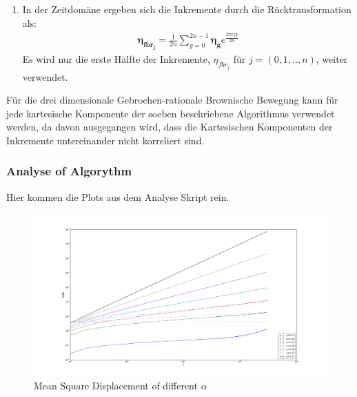 \documentclass[
  a4paper,BCOR10mm,oneside,
  bibtotoc,idxtotoc,
  headsepline,footsepline,%
  fleqn,openbib
]{scrbook}
\begin{document}
\begin{enumerate}
 \item In der Zeitdomäne ergeben sich die Inkremente durch die Rücktransformation als:
 \begin{align}
 \boldsymbol{\eta_{fbr_j}}= \frac{1}{2n} \sum_{g=0}^{2n-1} \boldsymbol{\eta_g} e^{\frac{2 \pi i j g }{2n}}
 \end{align}
Es wird nur die erste Hälfte der Inkremente, $\eta_{fbr_j}$ für $j=(0,1,..,n)$, weiter verwendet.
\end{enumerate}
Für die drei dimensionale Gebrochen-rationale Brownische Bewegung kann für jede kartesische Komponente der soeben beschriebene Algorithmus verwendet werden, da davon ausgegangen wird, dass die Kartesischen Komponenten der Inkremente untereinander nicht korreliert sind. 
\subsubsection{Analyse of Algorythm}
Hier kommen die Plots  aus dem Analyse Skript rein.

\begin{figure}[h]
\includegraphics[width=\textwidth]{./msd_ensemble_alpha.pdf}
\caption{Mean Square Displacement of different $\alpha$}
 \centering
\end{figure}
\end{document}
